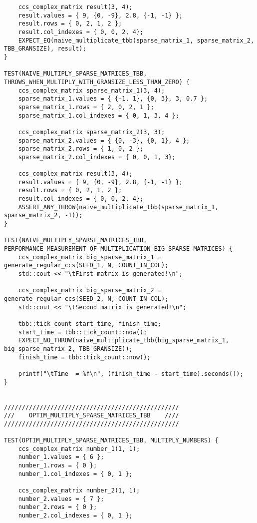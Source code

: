 \documentclass{report}
\begin{document}
\begin{itemize}
\begin{itemize}
\begin{lstlisting}
    ccs_complex_matrix result(3, 4);
    result.values = { 9, {0, -9}, 2.8, {-1, -1} };
    result.rows = { 0, 2, 1, 2 };
    result.col_indexes = { 0, 0, 2, 4};
    EXPECT_EQ(naive_multiplicate_tbb(sparse_matrix_1, sparse_matrix_2, TBB_GRANSIZE), result);
}

TEST(NAIVE_MULTIPLY_SPARSE_MATRICES_TBB, THROWS_WHEN_MULTIPLY_WITH_GRANSIZE_LESS_THAN_ZERO) {
    ccs_complex_matrix sparse_matrix_1(3, 4);
    sparse_matrix_1.values = { {-1, 1}, {0, 3}, 3, 0.7 };
    sparse_matrix_1.rows = { 2, 0, 2, 1 };
    sparse_matrix_1.col_indexes = { 0, 1, 3, 4 };

    ccs_complex_matrix sparse_matrix_2(3, 3);
    sparse_matrix_2.values = { {0, -3}, {0, 1}, 4 };
    sparse_matrix_2.rows = { 1, 0, 2 };
    sparse_matrix_2.col_indexes = { 0, 0, 1, 3};

    ccs_complex_matrix result(3, 4);
    result.values = { 9, {0, -9}, 2.8, {-1, -1} };
    result.rows = { 0, 2, 1, 2 };
    result.col_indexes = { 0, 0, 2, 4};
    ASSERT_ANY_THROW(naive_multiplicate_tbb(sparse_matrix_1, sparse_matrix_2, -1));
}

TEST(NAIVE_MULTIPLY_SPARSE_MATRICES_TBB, PERFORMANCE_MEASUREMENT_OF_MULTIPLICATION_BIG_SPARSE_MATRICES) {
    ccs_complex_matrix big_sparse_matrix_1 = generate_regular_ccs(SEED_1, N, COUNT_IN_COL);
    std::cout << "\tFirst matrix is generated!\n";

    ccs_complex_matrix big_sparse_matrix_2 = generate_regular_ccs(SEED_2, N, COUNT_IN_COL);
    std::cout << "\tSecond matrix is generated!\n";

    tbb::tick_count start_time, finish_time;
    start_time = tbb::tick_count::now();
    EXPECT_NO_THROW(naive_multiplicate_tbb(big_sparse_matrix_1, big_sparse_matrix_2, TBB_GRANSIZE));
    finish_time = tbb::tick_count::now();

    printf("\tTime  = %f\n", (finish_time - start_time).seconds());
}


/////////////////////////////////////////////////
///    OPTIM_MULTIPLY_SPARSE_MATRICES_TBB    ////
/////////////////////////////////////////////////

TEST(OPTIM_MULTIPLY_SPARSE_MATRICES_TBB, MULTIPLY_NUMBERS) {
    ccs_complex_matrix number_1(1, 1);
    number_1.values = { 6 };
    number_1.rows = { 0 };
    number_1.col_indexes = { 0, 1 };

    ccs_complex_matrix number_2(1, 1);
    number_2.values = { 7 };
    number_2.rows = { 0 };
    number_2.col_indexes = { 0, 1 };


\end{lstlisting}
\end{itemize}
\end{itemize}
\end{document}
